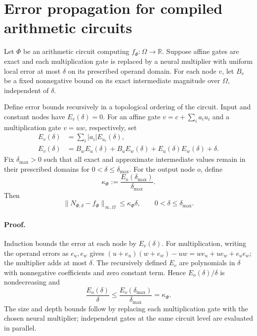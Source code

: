 \section{Error propagation for compiled arithmetic circuits}
\label{app:circuit-error}

Let $\Phi$ be an arithmetic circuit computing
$f_\Phi:\Omega\to\mathbb R$. Suppose affine gates are exact and each
multiplication gate is replaced by a neural multiplier with uniform local
error at most $\delta$ on its prescribed operand domain. For each node $v$,
let $B_v$ be a fixed nonnegative bound on its exact intermediate magnitude
over $\Omega$, independent of $\delta$.

Define error bounds recursively in a topological ordering of the circuit.
Input and constant nodes have $E_v(\delta)=0$. For an affine gate
$v=c+\sum_i a_i u_i$ and a multiplication gate $v=uw$, respectively, set
\begin{align*}
 E_v(\delta)&=\sum_i |a_i|E_{u_i}(\delta),\\
 E_v(\delta)&=B_wE_u(\delta)+B_uE_w(\delta)
             +E_u(\delta)E_w(\delta)+\delta.
\end{align*}
Fix $\delta_{\max}>0$ such that all exact and approximate intermediate
values remain in their prescribed domains for $0<\delta\le\delta_{\max}$.
For the output node $o$, define
\[
 \kappa_\Phi:=\frac{E_o(\delta_{\max})}{\delta_{\max}}.
\]
Then
\[
 \|N_{\Phi,\delta}-f_\Phi\|_{\infty,\Omega}
 \le\kappa_\Phi\delta,
 \qquad 0<\delta\le\delta_{\max}.
\]

\paragraph{Proof.}
Induction bounds the error at each node by $E_v(\delta)$.
For multiplication, writing the operand errors as $e_u,e_w$ gives
$(u+e_u)(w+e_w)-uw=we_u+ue_w+e_ue_w$; the multiplier adds at most
$\delta$. The recursively defined $E_v$ are polynomials in $\delta$
with nonnegative coefficients and zero constant term. Hence
$E_o(\delta)/\delta$ is nondecreasing and
\[
 \frac{E_o(\delta)}{\delta}
 \le\frac{E_o(\delta_{\max})}{\delta_{\max}}=\kappa_\Phi.
\]
The size and depth bounds follow by replacing each multiplication gate
with the chosen neural multiplier; independent gates at the same circuit
level are evaluated in parallel.
